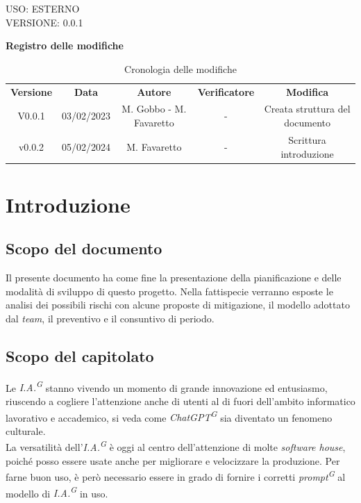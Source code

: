 \documentclass[5pt]{article}
\begin{document}
\begin{flushright}
    \begin{spacing}{1}
        USO: ESTERNO\\
        VERSIONE: 0.0.1\\
    \end{spacing}
\end{flushright}


\restoregeometry

\pagebreak

\textbf{\Large Registro delle modifiche}
\begin{table}[ht]
\centering
\begin{tabular}{|c|c|c|c|c|}
\hline
\textbf{Versione} & \textbf{Data} & \textbf{Autore} & \textbf{Verificatore} & \textbf{Modifica} \\
V0.0.1 & 03/02/2023 & M. Gobbo - M. Favaretto & - & Creata struttura del documento \\
\hline
v0.0.2 & 05/02/2024 & M. Favaretto & - & Scrittura introduzione \\
\hline
\end{tabular}
\caption{Cronologia delle modifiche}
\label{tab:conference}
\end{table}

\pagebreak
\tableofcontents
\pagebreak

\section{Introduzione}
\subsection{Scopo del documento}
Il presente documento ha come fine la presentazione della pianificazione e delle modalità di sviluppo di questo progetto. 
Nella fattispecie verranno esposte le analisi dei possibili rischi con alcune proposte di mitigazione, il modello adottato dal \textit{team}, 
il preventivo e il consuntivo di periodo.

\subsection{Scopo del capitolato}
Le \textit{I.A.\textsuperscript{G}} stanno vivendo un momento di grande innovazione ed entusiasmo, 
riuscendo a cogliere l'attenzione anche di utenti al di fuori dell'ambito informatico lavorativo e accademico, 
si veda come \textit{ChatGPT\textsuperscript{G}} sia diventato un fenomeno culturale. \\
La versatilità dell'\textit{I.A.\textsuperscript{G}} è oggi al centro dell'attenzione di molte \textit{software house}, 
poiché posso essere usate anche per migliorare e velocizzare la produzione. 
Per farne buon uso, è però necessario essere in grado di fornire i corretti \textit{prompt\textsuperscript{G}} al 
modello di \textit{I.A.\textsuperscript{G}} in uso. \\
\end{document}
